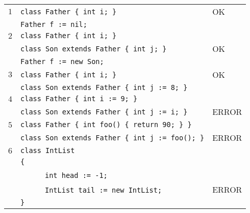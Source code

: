\documentclass{article}
\begin{document}
\begin{table}[h]
\centering
\begin{tabular}{|l|l|l|}
\hline
 $1$ & \verb"class Father { int i; }"             & OK \\
     & \verb"Father f := nil;"                   &    \\
\hline
 $2$ & \verb"class Father { int i; }"             &    \\
     & \verb"class Son extends Father { int j; }" & OK \\
     & \verb"Father f := new Son;"                &    \\
\hline
 $3$ & \verb"class Father { int i; }"                  & OK \\
     & \verb"class Son extends Father { int j := 8; }" &    \\
\hline
 $4$ & \verb"class Father { int i := 9; }"             &       \\
     & \verb"class Son extends Father { int j := i; }" & ERROR \\
\hline
 $5$ & \verb"class Father { int foo() { return 90; } }"    &       \\
     & \verb"class Son extends Father { int j := foo(); }" & ERROR \\
\hline
 $6$ & \verb"class IntList"                       &       \\
     & \verb"{"                                   &       \\
     & ~ ~ ~ ~\verb"int head := -1;"              &       \\
     & ~ ~ ~ ~\verb"IntList tail := new IntList;" & ERROR \\
     & \verb"}"                                   &       \\
\hline

\end{tabular}
\end{table}
\end{document}
